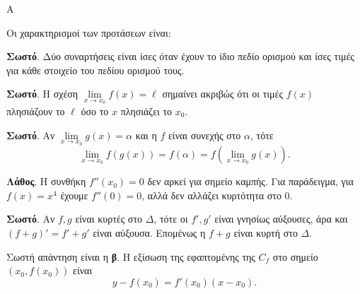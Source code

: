 \begin{thema}{Α}
\begin{erwthma}
\item {}

\item {}

\item {}

\item Οι χαρακτηρισμοί των προτάσεων είναι:
\begin{alist}
\item \textbf{Σωστό}. Δύο συναρτήσεις είναι ίσες όταν έχουν το ίδιο πεδίο ορισμού και ίσες τιμές για κάθε στοιχείο του πεδίου ορισμού τους.
\item \textbf{Σωστό}. Η σχέση $\lim\limits_{x\to x_0}f(x)=\ell$ σημαίνει ακριβώς ότι οι τιμές $f(x)$ πλησιάζουν το $\ell$ όσο το $x$ πλησιάζει το $x_0$.
\item \textbf{Σωστό}. Αν $\lim\limits_{x\to x_0}g(x)=\alpha$ και η $f$ είναι συνεχής στο $\alpha$, τότε
\[ \lim_{x\to x_0}f(g(x))=f(\alpha)=f\left(\lim_{x\to x_0}g(x)\right). \]
\item \textbf{Λάθος}. Η συνθήκη $f''(x_0)=0$ δεν αρκεί για σημείο καμπής. Για παράδειγμα, για $f(x)=x^4$ έχουμε $f''(0)=0$, αλλά δεν αλλάζει κυρτότητα στο $0$.
\item \textbf{Σωστό}. Αν $f,g$ είναι κυρτές στο $\varDelta$, τότε οι $f',g'$ είναι γνησίως αύξουσες, άρα και $(f+g)'=f'+g'$ είναι αύξουσα. Επομένως η $f+g$ είναι κυρτή στο $\varDelta$.
\end{alist}

\item Σωστή απάντηση είναι η \textbf{β}. Η εξίσωση της εφαπτομένης της $C_f$ στο σημείο $(x_0,f(x_0))$ είναι
\[ y-f(x_0)=f'(x_0)(x-x_0). \]
\end{erwthma}
\end{thema}


